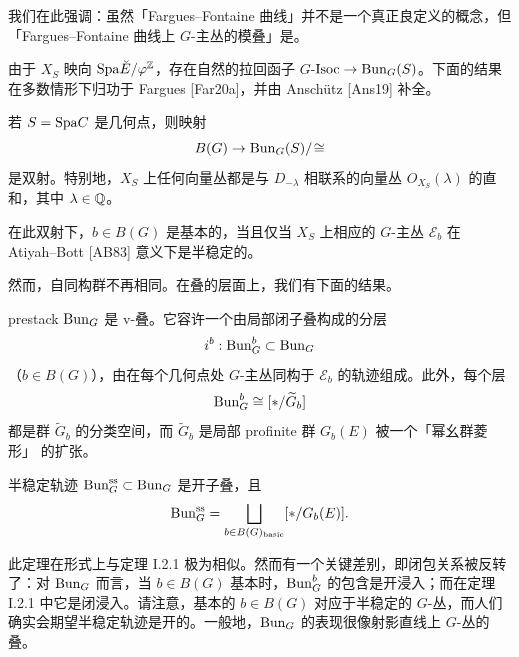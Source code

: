 \begin{remark}%
我们在此强调：虽然「Fargues–Fontaine 曲线」并不是一个真正良定义的概念，但「Fargues–Fontaine 曲线上 $G$-主丛的模叠」是。
\end{remark}

\leavevmode{}由于 $X_S$ 映向 $\mathrm{Spa}\breve{E}/\varphi^{\mathbb{Z}}$，存在自然的拉回函子 $G$-$\mathrm{Isoc}\to\mathrm{Bun}_G(S)$。下面的结果在多数情形下归功于 Fargues [Far20a]，并由 Anschütz [Ans19] 补全。

\begin{theorem}%
若 $S=\mathrm{Spa} C$ 是几何点，则映射
\[
  B(G)\to\mathrm{Bun}_G(S)/\!\cong
\]
是双射。特别地，$X_S$ 上任何向量丛都是与 $D_{-\lambda}$ 相联系的向量丛 $O_{X_S}(\lambda)$ 的直和，其中 $\lambda\in\mathbb{Q}$。

在此双射下，$b\in B(G)$ 是基本的，当且仅当 $X_S$ 上相应的 $G$-主丛 $\mathcal{E}_b$ 在 Atiyah–Bott [AB83] 意义下是半稳定的。
\end{theorem}

然而，自同构群不再相同。在叠的层面上，我们有下面的结果。

\begin{theorem}%
prestack $\mathrm{Bun}_G$ 是 v-叠。它容许一个由局部闭子叠构成的分层
\[
  i^b : \mathrm{Bun}_G^b \subset \mathrm{Bun}_G
\]
（$b\in B(G)$），由在每个几何点处 $G$-主丛同构于 $\mathcal{E}_b$ 的轨迹组成。此外，每个层
\[
  \mathrm{Bun}_G^b \cong [\ast/\widetilde{G}_b]
\]
都是群 $\widetilde{G}_b$ 的分类空间，而 $\widetilde{G}_b$ 是局部 profinite 群 $G_b(E)$ 被一个「幂幺群菱形」
的扩张。

半稳定轨迹 $\mathrm{Bun}_G^{\mathrm{ss}}\subset\mathrm{Bun}_G$ 是开子叠，且
\[
  \mathrm{Bun}_G^{\mathrm{ss}} = \bigsqcup_{b\in B(G)_{\mathrm{basic}}}[\ast/G_b(E)].
\]
\end{theorem}

\begin{remark}%
此定理在形式上与定理 I.2.1 极为相似。然而有一个关键差别，即闭包关系被反转了：对 $\mathrm{Bun}_G$ 而言，当 $b\in B(G)$ 基本时，$\mathrm{Bun}_G^b$ 的包含是开浸入；而在定理 I.2.1 中它是闭浸入。请注意，基本的 $b\in B(G)$ 对应于半稳定的 $G$-丛，而人们确实会期望半稳定轨迹是开的。一般地，$\mathrm{Bun}_G$ 的表现很像射影直线上 $G$-丛的叠。
\end{remark}

